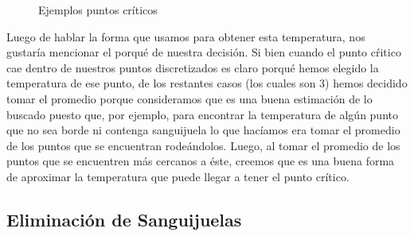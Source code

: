 \documentclass[10pt, a4paper]{article}
\begin{document}
\begin{figure}[H]
\centering
	\hfil
	
\hfil
{}
\caption{Ejemplos puntos cr\'iticos} 
\end{figure}

Luego de hablar la forma que usamos para obtener esta temperatura, nos gustar\'ia mencionar el porqu\'e de nuestra decisi\'on. Si bien cuando el punto c\'ritico cae dentro de nuestros puntos discretizados es claro porqu\'e hemos elegido la temperatura de ese punto, de los restantes casos (los cuales son 3) hemos decidido tomar el promedio porque consideramos que es una buena estimaci\'on de lo buscado puesto que, por ejemplo, para encontrar la temperatura de alg\'un punto que no sea borde ni contenga sanguijuela lo que hac\'iamos era tomar el promedio de los puntos que se encuentran rode\'andolos. Luego, al tomar el promedio de los puntos que se encuentren m\'as cercanos a \'este, creemos que es una buena forma de aproximar la temperatura que puede llegar a tener el punto cr\'itico.

\subsection{Eliminaci\'on de Sanguijuelas}
\end{document}
